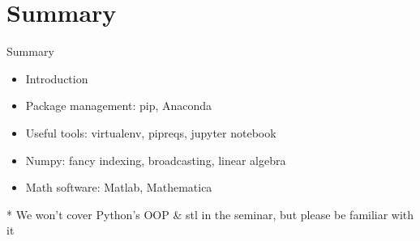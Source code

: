 \documentclass{../TexTemplate/myslide}
\begin{document}
\section{Summary}
\begin{frame}
\sectionpage
\end{frame}

\begin{frame}{Summary}
\begin{itemize}
	\item Introduction
	\item Package management: pip, Anaconda
	\item Useful tools: virtualenv, pipreqs, jupyter notebook
	\item Numpy: fancy indexing, broadcasting, linear algebra
	\item Math software: Matlab, Mathematica
\end{itemize}
* We won't cover Python's OOP \& stl in the seminar, but please be familiar with it
\end{frame}
\end{document}
